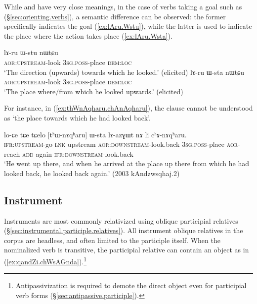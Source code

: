 While  and  have very close meanings, in the case of verbs taking a goal such as  (§\ref{sec:orienting.verbs}), a semantic difference can be observed: the former specifically indicates the goal (\ref{ex:lAru.Wstu}), while the latter is used to indicate the place where the action takes place (\ref{ex:lAru.Wsta}).

\begin{exe}
\ex 
\begin{xlist}
\ex \label{ex:lAru.Wstu}
\gll lɤ-ru ɯ-stu nɯtɕu \\
\textsc{aor}:\textsc{upstream}-look \textsc{3sg}.\textsc{poss}-place \textsc{dem}:\textsc{loc} \\
\glt `The direction (upwards) towards which he looked.' (elicited)
\ex \label{ex:lAru.Wsta}
\gll lɤ-ru ɯ-sta nɯtɕu \\
\textsc{aor}:\textsc{upstream}-look \textsc{3sg}.\textsc{poss}-place \textsc{dem}:\textsc{loc} \\
\glt `The place where/from which he looked upwards.' (elicited)
\end{xlist}
\end{exe}
 
For instance, in (\ref{ex:thWnAqharu.chAnAqharu}), the clause  cannot be understood as `the place towards which he had looked back'.

\begin{exe}
\ex \label{ex:thWnAqharu.chAnAqharu}
 \gll lo-ɕe tɕe tɕelo [tʰɯ-nɤqʰaru] ɯ-sta lɤ-azɣɯt nɤ li cʰɤ-nɤqʰaru. \\
\textsc{ifr}:\textsc{upstream}-go \textsc{lnk} upstream \textsc{aor}:\textsc{downstream}-look.back \textsc{3sg}.\textsc{poss}-place \textsc{aor}-reach \textsc{add} again \textsc{ifr}:\textsc{downstream}-look.back  \\
\glt `He went up there, and when he arrived at the place up there from which he had looked back, he looked back again.' (2003 kAndzwsqhaj.2)
 \end{exe}
 

 
\subsection{Instrument} \label{sec:instrument.relativization}
Instruments are most commonly relativized using oblique participial relatives (§\ref{sec:instrumental.participle.relatives}). All instrument oblique relatives in the corpus are headless, and often limited to the participle itself. When the nominalized verb is transitive, the participial relative can contain an object  as in (\ref{ex:qandZi.chWsAGnda}).\footnote{Antipassivization is required to demote the direct object even for participial verb forms (§\ref{sec:antipassive.participle}). }

